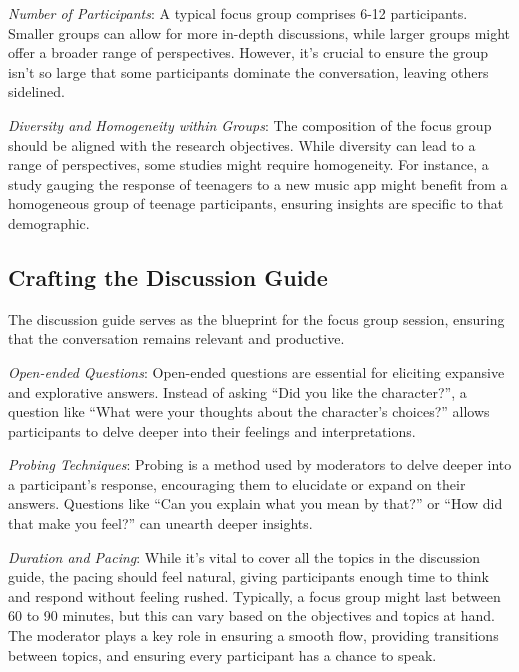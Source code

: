\documentclass[
  b5paper]{book}
\begin{document}
\emph{Number of Participants}: A typical focus group comprises 6-12 participants. Smaller groups can allow for more in-depth discussions, while larger groups might offer a broader range of perspectives. However, it's crucial to ensure the group isn't so large that some participants dominate the conversation, leaving others sidelined.

\emph{Diversity and Homogeneity within Groups}: The composition of the focus group should be aligned with the research objectives. While diversity can lead to a range of perspectives, some studies might require homogeneity. For instance, a study gauging the response of teenagers to a new music app might benefit from a homogeneous group of teenage participants, ensuring insights are specific to that demographic.

\hypertarget{crafting-the-discussion-guide}{%
\subsection*{Crafting the Discussion Guide}\label{crafting-the-discussion-guide}}

The discussion guide serves as the blueprint for the focus group session, ensuring that the conversation remains relevant and productive.

\emph{Open-ended Questions}: Open-ended questions are essential for eliciting expansive and explorative answers. Instead of asking ``Did you like the character?'', a question like ``What were your thoughts about the character's choices?'' allows participants to delve deeper into their feelings and interpretations.

\emph{Probing Techniques}: Probing is a method used by moderators to delve deeper into a participant's response, encouraging them to elucidate or expand on their answers. Questions like ``Can you explain what you mean by that?'' or ``How did that make you feel?'' can unearth deeper insights.

\emph{Duration and Pacing}: While it's vital to cover all the topics in the discussion guide, the pacing should feel natural, giving participants enough time to think and respond without feeling rushed. Typically, a focus group might last between 60 to 90 minutes, but this can vary based on the objectives and topics at hand. The moderator plays a key role in ensuring a smooth flow, providing transitions between topics, and ensuring every participant has a chance to speak.
\end{document}
